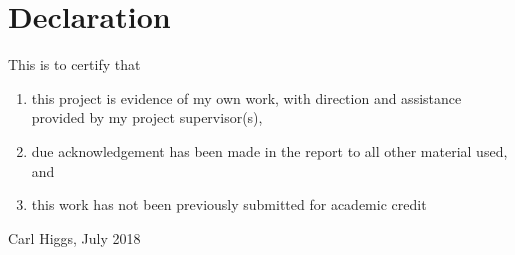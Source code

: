 \section*{Declaration}

This is to certify that
\begin{enumerate}
	\item this project is evidence of my own work, with direction and assistance provided by my project supervisor(s),
	\item due acknowledgement has been made in the report to all other material used, and
  \item this work has not been previously submitted for academic credit
\end{enumerate}
\vspace{5cm}
\underline{\hspace{7.52cm}} \par
Carl Higgs, July 2018 \par
\vfill\null